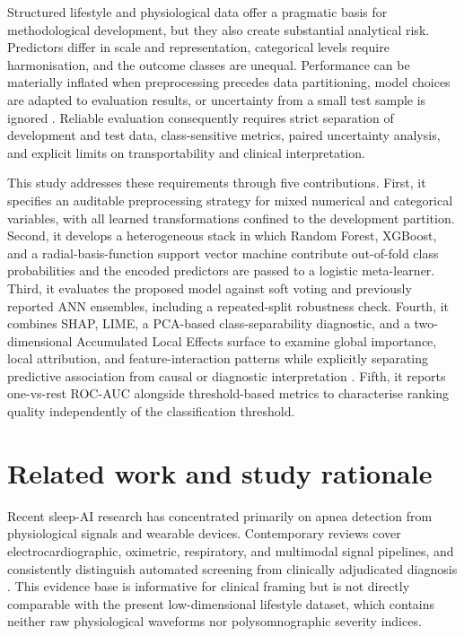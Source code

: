 \documentclass{turkjour}%
\begin{document}
Structured lifestyle and physiological data offer a pragmatic basis for methodological development, but they also create substantial analytical risk. Predictors differ in scale and representation, categorical levels require harmonisation, and the outcome classes are unequal. Performance can be materially inflated when preprocessing precedes data partitioning, model choices are adapted to evaluation results, or uncertainty from a small test sample is ignored \cite{Kapoor2023, Collins2024, Efthimiou2024}. Reliable evaluation consequently requires strict separation of development and test data, class-sensitive metrics, paired uncertainty analysis, and explicit limits on transportability and clinical interpretation.

This study addresses these requirements through five contributions. First, it specifies an auditable preprocessing strategy for mixed numerical and categorical variables, with all learned transformations confined to the development partition. Second, it develops a heterogeneous stack in which Random Forest, XGBoost, and a radial-basis-function support vector machine contribute out-of-fold class probabilities and the encoded predictors are passed to a logistic meta-learner. Third, it evaluates the proposed model against soft voting and previously reported ANN ensembles, including a repeated-split robustness check. Fourth, it combines SHAP, LIME, a PCA-based class-separability diagnostic, and a two-dimensional Accumulated Local Effects surface to examine global importance, local attribution, and feature-interaction patterns while explicitly separating predictive association from causal or diagnostic interpretation \cite{Jung2023, Allen2024, Pesapane2026}. Fifth, it reports one-vs-rest ROC-AUC alongside threshold-based metrics to characterise ranking quality independently of the classification threshold.

\section{Related work and study rationale}
Recent sleep-AI research has concentrated primarily on apnea detection from physiological signals and wearable devices. Contemporary reviews cover electrocardiographic, oximetric, respiratory, and multimodal signal pipelines, and consistently distinguish automated screening from clinically adjudicated diagnosis \cite{Giorgi2025, Bazoukis2023, AbdAlrazaq2024, Tyagi2023}. This evidence base is informative for clinical framing but is not directly comparable with the present low-dimensional lifestyle dataset, which contains neither raw physiological waveforms nor polysomnographic severity indices.
\end{document}

